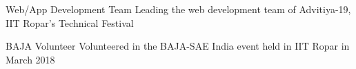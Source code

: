 
\begin{misc}


\cvskill
    {Web/App Development Team} %
    {{Leading the web development team of Advitiya-19, IIT Ropar's Technical Festival}}

\cvskill
    {BAJA Volunteer} %
    {{Volunteered in the BAJA-SAE India event held in IIT Ropar in March 2018}}





\end{misc}
